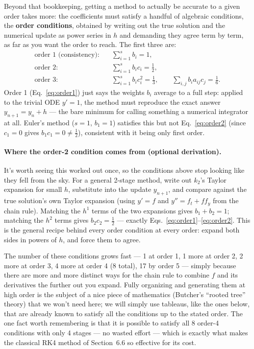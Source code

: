 Beyond that bookkeeping, getting a method to actually be accurate to a given order takes more: the coefficients must satisfy a handful of algebraic conditions, the \textbf{order conditions}, obtained by writing out the true solution and the numerical update as power series in $h$ and demanding they agree term by term, as far as you want the order to reach. The first three are:
\begin{align}
\text{order } 1 \text{ (consistency):} &\quad \sum_{i=1}^s b_i = 1, \label{eq:order1}\\
\text{order } 2: &\quad \sum_{i=1}^s b_i c_i = \frac{1}{2}, \label{eq:order2}\\
\text{order } 3: &\quad \sum_{i=1}^s b_i c_i^2 = \frac{1}{3}, \qquad \sum_{i,j} b_i a_{ij} c_j = \frac{1}{6}. \label{eq:order3}
\end{align}
Order 1 (Eq.~\eqref{eq:order1}) just says the weights $b_i$ average to a full step: applied to the trivial ODE $y'=1$, the method must reproduce the exact answer $y_{n+1}=y_n+h$ --- the bare minimum for calling something a numerical integrator at all. Euler's method ($s=1$, $b_1=1$) satisfies this but not Eq.~\eqref{eq:order2} (since $c_1=0$ gives $b_1c_1=0\ne\tfrac12$), consistent with it being only first order.

\paragraph{Where the order-2 condition comes from (optional derivation).} It's worth seeing this worked out once, so the conditions above stop looking like they fell from the sky. For a general 2-stage method, write out $k_2$'s Taylor expansion for small $h$, substitute into the update $y_{n+1}$, and compare against the true solution's own Taylor expansion (using $y'=f$ and $y''=f_t+ff_y$ from the chain rule). Matching the $h^1$ terms of the two expansions gives $b_1+b_2=1$; matching the $h^2$ terms gives $b_2c_2=\tfrac12$ --- exactly Eqs.~\eqref{eq:order1}--\eqref{eq:order2}. This is the general recipe behind every order condition at every order: expand both sides in powers of $h$, and force them to agree.

The number of these conditions grows fast --- 1 at order 1, 1 more at order 2, 2 more at order 3, 4 more at order 4 (8 total), 17 by order 5 --- simply because there are more and more distinct ways for the chain rule to combine $f$ and its derivatives the further out you expand. Fully organizing and generating them at high order is the subject of a nice piece of mathematics (Butcher's ``rooted tree'' theory) that we won't need here; we will simply use tableaus, like the ones below, that are already known to satisfy all the conditions up to the stated order. The one fact worth remembering is that it is possible to satisfy all 8 order-4 conditions with only 4 stages --- no wasted effort --- which is exactly what makes the classical RK4 method of Section~6.6 so effective for its cost.

